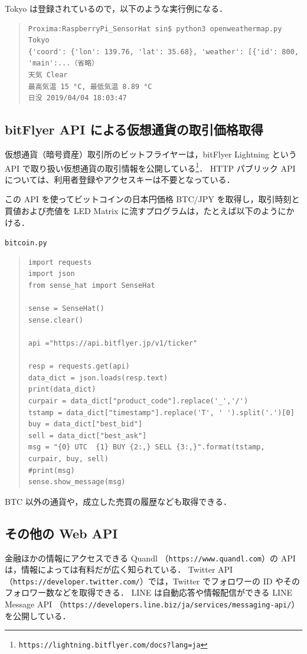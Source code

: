 \documentclass[11pt,a4,epsf]{article}
\begin{document}
Tokyo は登録されているので，以下のような実行例になる．
\begin{quote}
\small
\begin{verbatim}
Proxima:RaspberryPi_SensorHat sin$ python3 openweathermap.py Tokyo
{'coord': {'lon': 139.76, 'lat': 35.68}, 'weather': [{'id': 800, 'main':...（省略）
天気 Clear
最高気温 15 °C, 最低気温 8.89 °C
日没 2019/04/04 18:03:47
\end{verbatim}
\end{quote}

\subsection{bitFlyer API による仮想通貨の取引価格取得}

仮想通貨（暗号資産）取引所のビットフライヤーは，bitFlyer Lightning という API で取り扱い仮想通貨の取引情報を公開している\footnote{{\tt https://lightning.bitflyer.com/docs?lang=ja} }．
HTTP パブリック API については、利用者登録やアクセスキーは不要となっている．

この API を使ってビットコインの日本円価格 BTC/JPY を取得し，取引時刻と買値および売値を LED Matrix に流すプログラムは，たとえば以下のようにかける．
\begin{itembox}[l]{\tt bitcoin.py}
\begin{quote}
\small
\begin{verbatim}
import requests
import json
from sense_hat import SenseHat

sense = SenseHat()
sense.clear()
 
api ="https://api.bitflyer.jp/v1/ticker"
 
resp = requests.get(api)
data_dict = json.loads(resp.text) 
print(data_dict)
curpair = data_dict["product_code"].replace('_','/')
tstamp = data_dict["timestamp"].replace('T', ' ').split('.')[0]
buy = data_dict["best_bid"]
sell = data_dict["best_ask"]
msg = "{0} UTC  {1} BUY {2:,} SELL {3:,}".format(tstamp, curpair, buy, sell)
#print(msg)
sense.show_message(msg)
\end{verbatim}
\end{quote}
\end{itembox}
BTC 以外の通貨や，成立した売買の履歴なども取得できる．

\subsection{その他の Web API}

金融ほかの情報にアクセスできる Quandl （\verb+https://www.quandl.com+）の API は，情報によっては有料だが広く知られている．
Twitter API （\verb+https://developer.twitter.com/+）では，Twitter でフォロワーの ID やそのフォロワー数などを取得できる．
LINE は自動応答や情報配信ができる LINE Message API （\verb+https://developers.line.biz/ja/services/messaging-api/+）を公開している．
\end{document}
